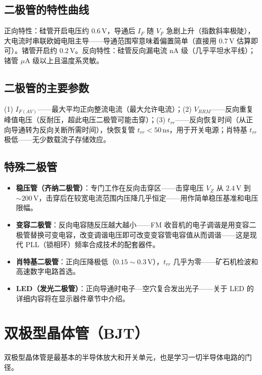 \documentclass[12pt,UTF8]{ctexbook}
\begin{document}
\subsection{二极管的特性曲线}

正向特性：硅管开启电压约 $0.6\,\mathrm{V}$，导通后 $I_F$ 随 $V_F$ 急剧上升（指数斜率极陡），大电流时串联欧姆电阻主导——导通范围窄意味着偏置简单（直接用 $0.7\,\mathrm{V}$ 估算即可）。锗管开启约 $0.2\,\mathrm{V}$。反向特性：硅管反向漏电流 nA 级（几乎平坦水平线）；锗管 $\mu\mathrm{A}$ 级以上且温度系灵敏。

\subsection{二极管的主要参数}

(1) $I_{F(AV)}$——最大平均正向整流电流（最大允许电流）；(2) $V_{RRM}$——反向重复峰值电压（反耐压，超此电压二极管可能击穿）；(3) $t_{rr}$——反向恢复时间（从正向导通转为反向关断所需时间），快恢复管 $t_{rr} < 50\,\mathrm{ns}$，用于开关电源；肖特基 $t_{rr}$ 极低——无少数载流子存储效应。

\subsection{特殊二极管}

\begin{itemize}
  \item \textbf{稳压管（齐纳二极管）}：专门工作在反向击穿区——击穿电压 $V_Z$ 从 $2.4\,\mathrm{V}$ 到 $\sim200\,\mathrm{V}$，击穿后在较宽电流范围内压降几乎恒定——用作简单稳压基准和电压限幅。
  \item \textbf{变容二极管}：反向电容随反压越大越小——FM 收音机的电子调谐是用变容二极管替换可变电容，改变调谐电压即可改变变容管电容值从而调谐——这是现代 PLL（锁相环）频率合成技术的配套器件。
  \item \textbf{肖特基二极管}：正向压降极低（$0.15\sim0.3\,\mathrm{V}$），$t_{rr}$ 几乎为零——矿石机检波和高速数字电路首选。
  \item \textbf{LED（发光二极管）}：正向导通时电子—空穴复合发出光子——关于 LED 的详细内容将在显示器件章节中介绍。
\end{itemize}

\section{双极型晶体管（BJT）}
\label{sec:bjt}

双极型晶体管是最基本的半导体放大和开关单元，也是学习一切半导体电路的门径。
\end{document}
